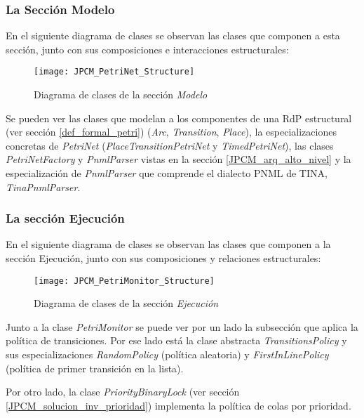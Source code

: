 \subsubsection{La Sección Modelo}
En el siguiente diagrama de clases se observan las clases que componen a esta
sección, junto con sus composiciones e interacciones estructurales:

\begin{figure}[H]
  \hspace*{-3cm}
  \texttt{[image: JPCM\_PetriNet\_Structure]}
  \caption{Diagrama de clases de la sección \textit{Modelo}}
  \label{fig:JPCM_PetriNet_Structure}
\end{figure}

Se pueden ver las clases que modelan a los componentes de una RdP estructural
(ver sección \ref{def_formal_petri}) (\textit{Arc}, \textit{Transition},
\textit{Place}), la especializaciones concretas de \textit{PetriNet}
(\textit{PlaceTransitionPetriNet} y \textit{TimedPetriNet}), las clases
\textit{PetriNetFactory} y \textit{PnmlParser} vistas en la sección
\ref{JPCM_arq_alto_nivel} y la especialización de \textit{PnmlParser} que
comprende el dialecto PNML de TINA, \textit{TinaPnmlParser}.

\subsubsection{La sección Ejecución}
En el siguiente diagrama de clases se observan las clases que componen a la
sección Ejecución, junto con sus composiciones y relaciones estructurales:

\begin{figure}[H]
  \hspace*{-2.5cm}
  \texttt{[image: JPCM\_PetriMonitor\_Structure]}
  \caption{Diagrama de clases de la sección \textit{Ejecución}}
  \label{fig:JPCM_PetriMonitor_Structure}
\end{figure}

Junto a la clase \textit{PetriMonitor} se puede ver por un lado la subsección
que aplica la política de transiciones. Por ese lado está la clase abstracta
\textit{TransitionsPolicy} y sus especializaciones \textit{RandomPolicy}
(política aleatoria) y \textit{FirstInLinePolicy} (política de primer transición
en la lista).

Por otro lado, la clase \textit{PriorityBinaryLock} (ver sección
\ref{JPCM_solucion_inv_prioridad}) implementa la política de colas por
prioridad.

